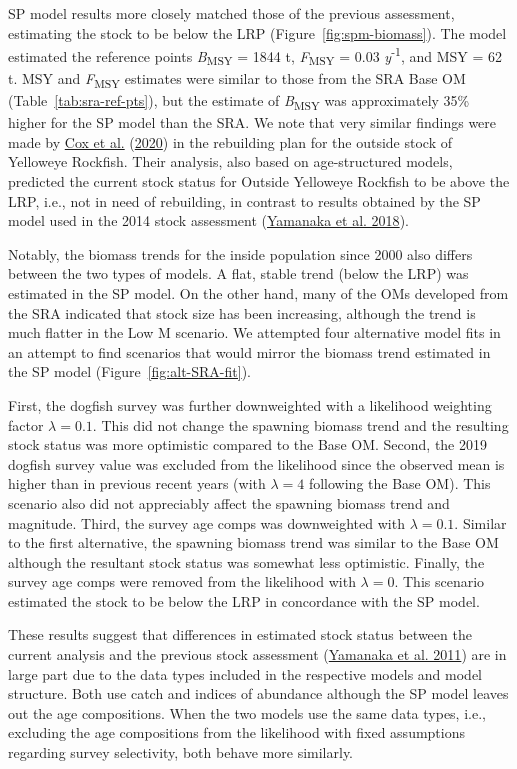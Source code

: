 \documentclass[11pt]{book}
\begin{document}
SP model results more closely matched those of the previous assessment, estimating the stock to be below the LRP (Figure~\ref{fig:spm-biomass}). The model estimated the reference points \emph{B}\textsubscript{MSY} = 1844 t, \emph{F}\textsubscript{MSY} = 0.03 \emph{y}\textsuperscript{-1}, and MSY = 62 t. MSY and \emph{F}\textsubscript{MSY} estimates were similar to those from the SRA Base OM (Table~\ref{tab:sra-ref-pts}), but the estimate of \emph{B}\textsubscript{MSY} was approximately 35\% higher for the SP model than the SRA. We note that very similar findings were made by \protect\hyperlink{ref-cox2020}{Cox et al.} (\protect\hyperlink{ref-cox2020}{2020}) in the rebuilding plan for the outside stock of Yelloweye Rockfish. Their analysis, also based on age-structured models, predicted the current stock status for Outside Yelloweye Rockfish to be above the LRP, i.e., not in need of rebuilding, in contrast to results obtained by the SP model used in the 2014 stock assessment (\protect\hyperlink{ref-yamanaka2018yelloweyeoutside}{Yamanaka et al. 2018}).

Notably, the biomass trends for the inside population since 2000 also differs between the two types of models. A flat, stable trend (below the LRP) was estimated in the SP model. On the other hand, many of the OMs developed from the SRA indicated that stock size has been increasing, although the trend is much flatter in the Low M scenario. We attempted four alternative model fits in an attempt to find scenarios that would mirror the biomass trend estimated in the SP model (Figure~\ref{fig:alt-SRA-fit}).

First, the dogfish survey was further downweighted with a likelihood weighting factor \(\lambda = 0.1\). This did not change the spawning biomass trend and the resulting stock status was more optimistic compared to the Base OM. Second, the 2019 dogfish survey value was excluded from the likelihood since the observed mean is higher than in previous recent years (with \(\lambda = 4\) following the Base OM). This scenario also did not appreciably affect the spawning biomass trend and magnitude. Third, the survey age comps was downweighted with \(\lambda = 0.1\). Similar to the first alternative, the spawning biomass trend was similar to the Base OM although the resultant stock status was somewhat less optimistic. Finally, the survey age comps were removed from the likelihood with \(\lambda = 0\). This scenario estimated the stock to be below the LRP in concordance with the SP model.

These results suggest that differences in estimated stock status between the current analysis and the previous stock assessment (\protect\hyperlink{ref-yamanaka2011}{Yamanaka et al. 2011}) are in large part due to the data types included in the respective models and model structure. Both use catch and indices of abundance although the SP model leaves out the age compositions. When the two models use the same data types, i.e., excluding the age compositions from the likelihood with fixed assumptions regarding survey selectivity, both behave more similarly.
\end{document}
